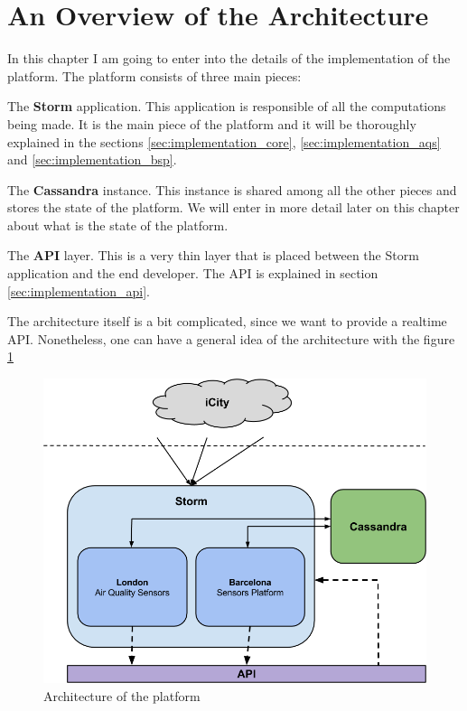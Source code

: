  
\section{An Overview of the Architecture}
\label{sec:implementation_intro}

In this chapter I am going to enter into the details of the implementation of
the platform. The platform consists of three main pieces:

\mylist
  \item The {\bf Storm} application. This application is responsible of all the
computations being made. It is the main piece of the platform and it will be
thoroughly explained in the sections \ref{sec:implementation_core},
\ref{sec:implementation_aqs} and \ref{sec:implementation_bsp}.
  \item The {\bf Cassandra} instance. This instance is shared among all the
other pieces and stores the state of the platform. We will enter in more detail
later on this chapter about what is the state of the platform.
  \item The {\bf API} layer. This is a very thin layer that is placed between
the Storm application and the end developer. The API is explained in section
\ref{sec:implementation_api}.
\mylistend

The architecture itself is a bit complicated, since we want to provide a
realtime API. Nonetheless, one can have a general idea of the architecture with
the figure \ref{fig:platform}

\begin{figure}
  \centering
  \includegraphics[scale=0.5]{implementation/images/platform.png}
  \caption{Architecture of the platform}\label{fig:platform}
\end{figure}

